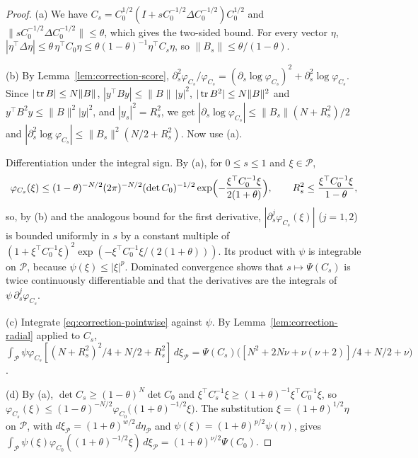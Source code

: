 \begin{proof}
(a) We have $C_s=C_0^{1/2}(I+sC_0^{-1/2}\Delta C_0^{-1/2})C_0^{1/2}$ and $\|sC_0^{-1/2}\Delta C_0^{-1/2}\|\le\theta$, which gives the two-sided bound. For every vector $\eta$, $|\eta^{\top}\Delta\eta|\le\theta\,\eta^{\top}C_0\eta\le\theta(1-\theta)^{-1}\eta^{\top}C_s\eta$, so $\|B_s\|\le\theta/(1-\theta)$.

(b) By Lemma~\ref{lem:correction-score}, $\partial_s^2\varphi_{C_s}/\varphi_{C_s}=(\partial_s\log\varphi_{C_s})^2+\partial_s^2\log\varphi_{C_s}$. Since $|\operatorname{tr} B|\le N\|B\|$, $|y^{\top}By|\le\|B\|\,|y|^2$, $|\operatorname{tr} B^2|\le N\|B\|^2$ and $y^{\top}B^2y\le\|B\|^2|y|^2$, and $|y_s|^2=R_s^2$, we get $|\partial_s\log\varphi_{C_s}|\le\|B_s\|(N+R_s^2)/2$ and $|\partial_s^2\log\varphi_{C_s}|\le\|B_s\|^2(N/2+R_s^2)$. Now use (a).

Differentiation under the integral sign. By (a), for $0\le s\le1$ and $\xi\in\mathcal P$,
\[
\varphi_{C_s}(\xi)\le(1-\theta)^{-N/2}(2\pi)^{-N/2}(\det C_0)^{-1/2}\exp\Bigl(-\frac{\xi^{\top}C_0^{-1}\xi}{2(1+\theta)}\Bigr),\qquad R_s^2\le\frac{\xi^{\top}C_0^{-1}\xi}{1-\theta},
\]
so, by (b) and the analogous bound for the first derivative, $|\partial_s^j\varphi_{C_s}(\xi)|$ ($j=1,2$) is bounded uniformly in $s$ by a constant multiple of $(1+\xi^{\top}C_0^{-1}\xi)^2\exp(-\xi^{\top}C_0^{-1}\xi/(2(1+\theta)))$. Its product with $\psi$ is integrable on $\mathcal P$, because $\psi(\xi)\le|\xi|^p$. Dominated convergence shows that $s\mapsto\Psi(C_s)$ is twice continuously differentiable and that the derivatives are the integrals of $\psi\,\partial_s^j\varphi_{C_s}$.

(c) Integrate \eqref{eq:correction-pointwise} against $\psi$. By Lemma~\ref{lem:correction-radial} applied to $C_s$, $\int_{\mathcal P}\psi\varphi_{C_s}[(N+R_s^2)^2/4+N/2+R_s^2]\,d\xi_{\mathcal P}=\Psi(C_s)\bigl([N^2+2N\nu+\nu(\nu+2)]/4+N/2+\nu\bigr)$.

(d) By (a), $\det C_s\ge(1-\theta)^N\det C_0$ and $\xi^{\top}C_s^{-1}\xi\ge(1+\theta)^{-1}\xi^{\top}C_0^{-1}\xi$, so $\varphi_{C_s}(\xi)\le(1-\theta)^{-N/2}\varphi_{C_0}\bigl((1+\theta)^{-1/2}\xi\bigr)$. The substitution $\xi=(1+\theta)^{1/2}\eta$ on $\mathcal P$, with $d\xi_{\mathcal P}=(1+\theta)^{w/2}d\eta_{\mathcal P}$ and $\psi(\xi)=(1+\theta)^{p/2}\psi(\eta)$, gives $\int_{\mathcal P}\psi(\xi)\varphi_{C_0}((1+\theta)^{-1/2}\xi)\,d\xi_{\mathcal P}=(1+\theta)^{\nu/2}\Psi(C_0)$.


\end{proof}
